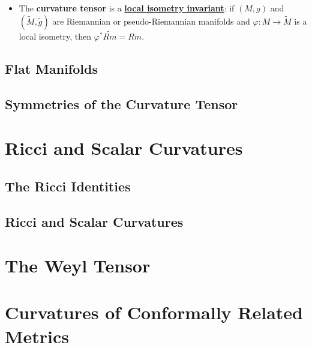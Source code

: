 \documentclass[11pt]{article}
\begin{document}
\begin{itemize}
\item \begin{proposition}
The \textbf{curvature tensor} is a \underline{\textbf{local isometry invariant}}: if $(M,g)$ and $(\widetilde{M}, \widetilde{g})$ are Riemannian or pseudo-Riemannian manifolds and $\varphi: M \rightarrow \widetilde{M}$ is a local isometry, then $\varphi^{*}\widetilde{Rm} = Rm$.
\end{proposition}
\end{itemize}
\subsection{Flat Manifolds}
\subsection{Symmetries of the Curvature Tensor}

\section{Ricci and Scalar Curvatures}
\subsection{The Ricci Identities}
\subsection{Ricci and Scalar Curvatures}

\section{The Weyl Tensor}
\section{Curvatures of Conformally Related Metrics}

\newpage


\end{document}
